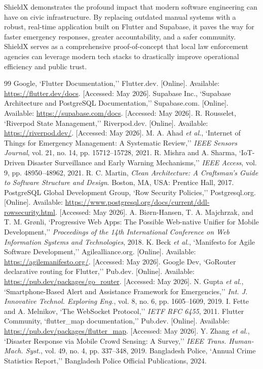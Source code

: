 \documentclass[12pt, a4paper, twoside, openany]{report}
\renewcommand{\bibname}{References}
\begin{document}
\vspace{0.5cm}
ShieldX demonstrates the profound impact that modern software engineering can have on civic infrastructure. By replacing outdated manual systems with a robust, real-time application built on Flutter and Supabase, it paves the way for faster emergency responses, greater accountability, and a safer community. ShieldX serves as a comprehensive proof-of-concept that local law enforcement agencies can leverage modern tech stacks to drastically improve operational efficiency and public trust.
\renewcommand{\bibname}{References}
\begin{thebibliography}{99}
 Google, `Flutter Documentation,'' Flutter.dev. [Online]. Available: \url{https://flutter.dev/docs}. [Accessed: May 2026].
 Supabase Inc., `Supabase Architecture and PostgreSQL Documentation,'' Supabase.com. [Online]. Available: \url{https://supabase.com/docs}. [Accessed: May 2026].
 R. Rousselet, `Riverpod State Management,'' Riverpod.dev. [Online]. Available: \url{https://riverpod.dev/}. [Accessed: May 2026].
 M. A. Ahad \textit{et al.}, `Internet of Things for Emergency Management: A Systematic Review,'' \textit{IEEE Sensors Journal}, vol. 21, no. 14, pp. 15712--15728, 2021.
 R. Mishra and A. Sharma, `IoT-Driven Disaster Surveillance and Early Warning Mechanisms,'' \textit{IEEE Access}, vol. 9, pp. 48950--48962, 2021.
 R. C. Martin, \textit{Clean Architecture: A Craftsman's Guide to Software Structure and Design}. Boston, MA, USA: Prentice Hall, 2017.
 PostgreSQL Global Development Group, `Row Security Policies,'' Postgresql.org. [Online]. Available: \url{https://www.postgresql.org/docs/current/ddl-rowsecurity.html}. [Accessed: May 2026].
 A. Biørn-Hansen, T. A. Majchrzak, and T. M. Grønli, `Progressive Web Apps: The Possible Web-native Unifier for Mobile Development,'' \textit{Proceedings of the 14th International Conference on Web Information Systems and Technologies}, 2018.
 K. Beck \textit{et al.}, `Manifesto for Agile Software Development,'' Agilealliance.org. [Online]. Available: \url{https://agilemanifesto.org/}. [Accessed: May 2026].
 Google Dev, `GoRouter declarative routing for Flutter,'' Pub.dev. [Online]. Available: \url{https://pub.dev/packages/go_router}. [Accessed: May 2026].
 N. Gupta \textit{et al.}, `Smartphone-Based Alert and Assistance Framework for Emergencies,'' \textit{Int. J. Innovative Technol. Exploring Eng.}, vol. 8, no. 6, pp. 1605--1609, 2019.
 I. Fette and A. Melnikov, `The WebSocket Protocol,'' \textit{IETF RFC 6455}, 2011.
 Flutter Community, `flutter\_map documentation,'' Pub.dev. [Online]. Available: \url{https://pub.dev/packages/flutter_map}. [Accessed: May 2026].
 Y. Zhang \textit{et al.}, `Disaster Response via Mobile Crowd Sensing: A Survey,'' \textit{IEEE Trans. Human-Mach. Syst.}, vol. 49, no. 4, pp. 337--348, 2019.
 Bangladesh Police, `Annual Crime Statistics Report,'' Bangladesh Police Official Publications, 2024.
\end{thebibliography}
\end{document}
